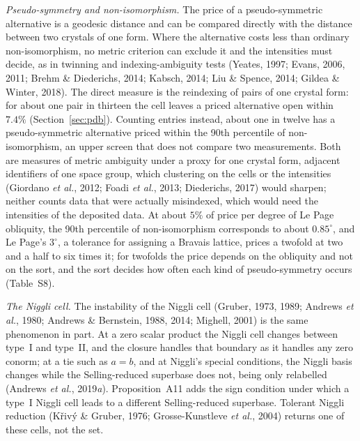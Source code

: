 \emph{Pseudo-symmetry and non-isomorphism.} The price of a pseudo-symmetric alternative is a geodesic distance and can be compared directly with the distance between two crystals of one form. Where the alternative costs less than ordinary non-isomorphism, no metric criterion can exclude it and the intensities must decide, as in twinning and indexing-ambiguity tests (Yeates, 1997; Evans, 2006, 2011; Brehm \& Diederichs, 2014; Kabsch, 2014; Liu \& Spence, 2014; Gildea \& Winter, 2018). The direct measure is the reindexing of pairs of one crystal form: for about one pair in thirteen the cell leaves a priced alternative open within $7.4\%$ (Section~\ref{sec:pdb}). Counting entries instead, about one in twelve has a pseudo-symmetric alternative priced within the 90th percentile of non-isomorphism, an upper screen that does not compare two measurements. Both are measures of metric ambiguity under a proxy for one crystal form, adjacent identifiers of one space group, which clustering on the cells or the intensities (Giordano \emph{et al.}, 2012; Foadi \emph{et al.}, 2013; Diederichs, 2017) would sharpen; neither counts data that were actually misindexed, which would need the intensities of the deposited data. At about $5\%$ of price per degree of Le Page obliquity, the 90th percentile of non-isomorphism corresponds to about $0.85^\circ$, and Le Page's $3^\circ$, a tolerance for assigning a Bravais lattice, prices a twofold at two and a half to six times it; for twofolds the price depends on the obliquity and not on the sort, and the sort decides how often each kind of pseudo-symmetry occurs (Table~S8).

\emph{The Niggli cell.} The instability of the Niggli cell (Gruber, 1973, 1989; Andrews \emph{et al.}, 1980; Andrews \& Bernstein, 1988, 2014; Mighell, 2001) is the same phenomenon in part. At a zero scalar product the Niggli cell changes between type~I and type~II, and the closure handles that boundary as it handles any zero conorm; at a tie such as $a=b$, and at Niggli's special conditions, the Niggli basis changes while the Selling-reduced superbase does not, being only relabelled (Andrews \emph{et al.}, 2019\emph{a}). Proposition~A11 adds the sign condition under which a type~I Niggli cell leads to a different Selling-reduced superbase. Tolerant Niggli reduction (K\v{r}iv\'y \& Gruber, 1976; Grosse-Kunstleve \emph{et al.}, 2004) returns one of these cells, not the set.


